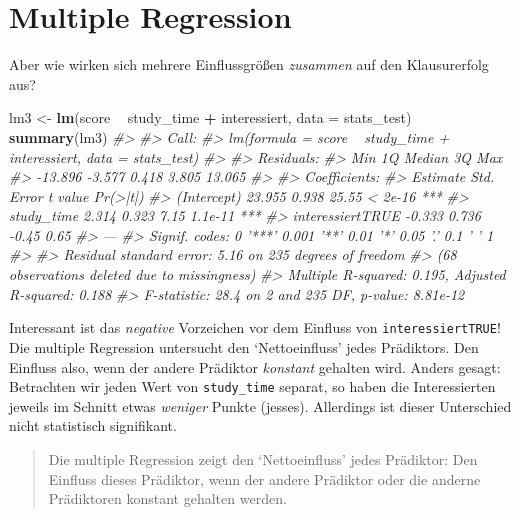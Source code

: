 \documentclass[12pt,ngerman,]{book}
\makeatletter
\newenvironment{Shaded}{\begin{snugshade}}{\end{snugshade}}
\newcommand{\KeywordTok}[1]{\textcolor[rgb]{0.13,0.29,0.53}{\textbf{#1}}}
\newcommand{\DataTypeTok}[1]{\textcolor[rgb]{0.13,0.29,0.53}{#1}}
\newcommand{\StringTok}[1]{\textcolor[rgb]{0.31,0.60,0.02}{#1}}
\newcommand{\CommentTok}[1]{\textcolor[rgb]{0.56,0.35,0.01}{\textit{#1}}}
\newcommand{\OperatorTok}[1]{\textcolor[rgb]{0.81,0.36,0.00}{\textbf{#1}}}
\newcommand{\NormalTok}[1]{#1}
\newenvironment{kframe}{%
\medskip{}
\setlength{\fboxsep}{.8em}
 \def\at@end@of@kframe{}%
 \ifinner\ifhmode%
  \def\at@end@of@kframe{\end{minipage}}%
  \begin{minipage}{\columnwidth}%
 \fi\fi%
 \def\FrameCommand##1{\hskip\@totalleftmargin \hskip-\fboxsep
 \colorbox{shadecolor}{##1}\hskip-\fboxsep
     \hskip-\linewidth \hskip-\@totalleftmargin \hskip\columnwidth}%
 \MakeFramed {\advance\hsize-\width
   \@totalleftmargin\z@ \linewidth\hsize
   \@setminipage}}%
 {\par\unskip\endMakeFramed%
 \at@end@of@kframe}
\renewenvironment{Shaded}{\begin{kframe}}{\end{kframe}}
\theoremstyle{definition}
\theoremstyle{definition}
\theoremstyle{remark}
\makeatother
\begin{document}
\section{Multiple Regression}\label{multiple-regression}

Aber wie wirken sich mehrere Einflussgrößen \emph{zusammen} auf den
Klausurerfolg aus?

\begin{Shaded}
\begin{Highlighting}[]
\NormalTok{lm3 <-}\StringTok{ }\KeywordTok{lm}\NormalTok{(score }\OperatorTok{~}\StringTok{ }\NormalTok{study_time }\OperatorTok{+}\StringTok{ }\NormalTok{interessiert, }\DataTypeTok{data =}\NormalTok{ stats_test)}
\KeywordTok{summary}\NormalTok{(lm3)}
\CommentTok{#> }
\CommentTok{#> Call:}
\CommentTok{#> lm(formula = score ~ study_time + interessiert, data = stats_test)}
\CommentTok{#> }
\CommentTok{#> Residuals:}
\CommentTok{#>     Min      1Q  Median      3Q     Max }
\CommentTok{#> -13.896  -3.577   0.418   3.805  13.065 }
\CommentTok{#> }
\CommentTok{#> Coefficients:}
\CommentTok{#>                  Estimate Std. Error t value Pr(>|t|)    }
\CommentTok{#> (Intercept)        23.955      0.938   25.55  < 2e-16 ***}
\CommentTok{#> study_time          2.314      0.323    7.15  1.1e-11 ***}
\CommentTok{#> interessiertTRUE   -0.333      0.736   -0.45     0.65    }
\CommentTok{#> ---}
\CommentTok{#> Signif. codes:  0 '***' 0.001 '**' 0.01 '*' 0.05 '.' 0.1 ' ' 1}
\CommentTok{#> }
\CommentTok{#> Residual standard error: 5.16 on 235 degrees of freedom}
\CommentTok{#>   (68 observations deleted due to missingness)}
\CommentTok{#> Multiple R-squared:  0.195,  Adjusted R-squared:  0.188 }
\CommentTok{#> F-statistic: 28.4 on 2 and 235 DF,  p-value: 8.81e-12}
\end{Highlighting}
\end{Shaded}

Interessant ist das \emph{negative} Vorzeichen vor dem Einfluss von
\texttt{interessiertTRUE}! Die multiple Regression untersucht den
`Nettoeinfluss' jedes Prädiktors. Den Einfluss also, wenn der andere
Prädiktor \emph{konstant} gehalten wird. Anders gesagt: Betrachten wir
jeden Wert von \texttt{study\_time} separat, so haben die Interessierten
jeweils im Schnitt etwas \emph{weniger} Punkte (jesses). Allerdings ist
dieser Unterschied nicht statistisch signifikant.

\begin{quote}
Die multiple Regression zeigt den `Nettoeinfluss' jedes Prädiktor: Den
Einfluss dieses Prädiktor, wenn der andere Prädiktor oder die anderne
Prädiktoren konstant gehalten werden.
\end{quote}
\end{document}
